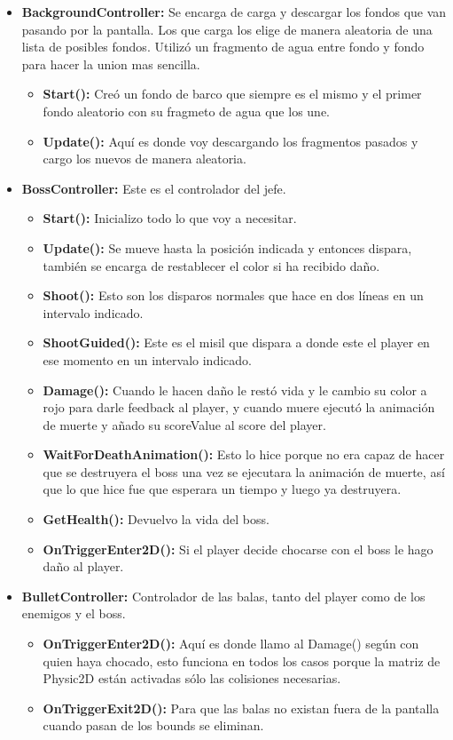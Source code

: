 \documentclass[titlepage, 4apaper]{article}
\begin{document}
\begin{itemize}
	\item \textbf{BackgroundController:} Se encarga de carga y descargar los fondos que van pasando por la pantalla. Los que carga los elige de manera aleatoria de una lista de posibles fondos. Utilizó un fragmento de agua entre fondo y fondo para hacer la union mas sencilla.
  \begin{itemize}
    \item \textbf{Start():} Creó un fondo de barco que siempre es el mismo y el primer fondo aleatorio con su fragmeto de agua que los une.
    \item \textbf{Update():} Aquí es donde voy descargando los fragmentos pasados y cargo los nuevos de manera aleatoria.
    \end{itemize}

  \item \textbf{BossController:} Este es el controlador del jefe.
  \begin{itemize}
    \item \textbf{Start():} Inicializo todo lo que voy a necesitar.
    \item \textbf{Update():} Se mueve hasta la posición indicada y entonces dispara, también se encarga de restablecer el color si ha recibido daño.
    \item \textbf{Shoot():} Esto son los disparos normales que hace en dos líneas en un intervalo indicado.
    \item \textbf{ShootGuided():} Este es el misil que dispara a donde este el player en ese momento en un intervalo indicado.
    \item \textbf{Damage():} Cuando le hacen daño le restó vida y le cambio su color a rojo para darle feedback al player, y cuando muere ejecutó la animación de muerte y  añado su scoreValue al score del player.
    \item \textbf{WaitForDeathAnimation():} Esto lo hice porque no era capaz de hacer que se destruyera el boss una vez se ejecutara la animación de muerte, así que lo que hice fue que esperara un tiempo y luego ya destruyera.
    \item \textbf{GetHealth():} Devuelvo la vida del boss.
    \item \textbf{OnTriggerEnter2D():} Si el player decide chocarse con el boss le hago daño al player.
  \end{itemize}

  \item \textbf{BulletController:} Controlador de las balas, tanto del player como de los enemigos y el boss.
  \begin{itemize}
    \item \textbf{OnTriggerEnter2D():} Aquí es donde llamo al Damage() según con quien haya chocado, esto funciona en todos los casos porque la matriz de Physic2D están activadas sólo las colisiones necesarias.
    \item \textbf{OnTriggerExit2D():} Para que las balas no existan fuera de la pantalla cuando pasan de los bounds se eliminan.
  \end{itemize}


\end{itemize}
\end{document}

